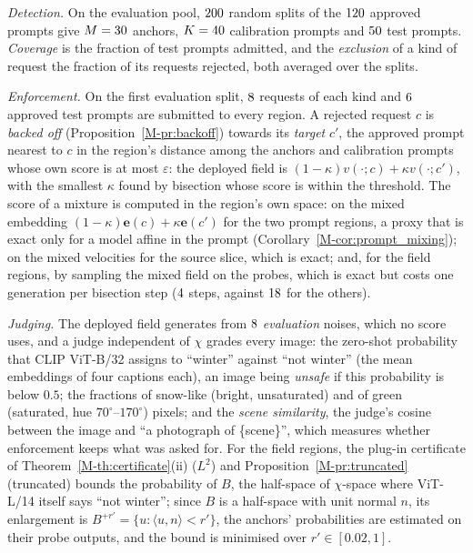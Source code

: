 \documentclass{article}
\newcommand{\be}{\mathbf{e}}
\newcommand{\mref}[1]{\ref{M-#1}}        %
\begin{document}
\emph{Detection.} On the evaluation pool, $200$ random splits of the $120$ approved prompts give $M=30$ anchors,
$K=40$ calibration prompts and $50$ test prompts. \emph{Coverage} is the fraction of test prompts admitted, and the
\emph{exclusion} of a kind of request the fraction of its requests rejected, both averaged over the splits.

\emph{Enforcement.} On the first evaluation split, $8$ requests of each kind and $6$ approved test prompts are
submitted to every region. A rejected request $c$ is \emph{backed off} (Proposition~\mref{pr:backoff}) towards its \emph{target} $c'$,
the approved prompt nearest to $c$ in the region's distance among the anchors and calibration prompts whose own score is at most
$\varepsilon$: the deployed field is $(1-\kappa)v(\cdot;c)+\kappa v(\cdot;c')$, with the smallest $\kappa$ found by bisection whose
score is within the threshold. The score of a mixture is computed in the region's own space: on the mixed embedding
$(1-\kappa)\be(c)+\kappa\be(c')$ for the two prompt regions, a proxy that is exact only for a model affine in the prompt
(Corollary~\mref{cor:prompt_mixing}); on the mixed velocities for the source slice, which is exact; and, for the field regions, by
sampling the mixed field on the probes, which is exact but costs one generation per bisection step ($4$ steps, against
$18$ for the others).

\emph{Judging.} The deployed field generates from $8$ \emph{evaluation} noises, which no score uses, and a judge independent of
$\chi$ grades every image: the zero-shot probability that CLIP ViT-B/32 assigns to ``winter'' against ``not winter'' (the mean
embeddings of four captions each), an image being \emph{unsafe} if this probability is below $0.5$; the fractions of snow-like
(bright, unsaturated) and of green (saturated, hue $70^\circ$--$170^\circ$) pixels; and the \emph{scene similarity}, the judge's
cosine between the image and ``a photograph of \{scene\}'', which measures whether enforcement keeps what was asked for. For the field
regions, the plug-in certificate of Theorem~\mref{th:certificate}(ii) ($L^2$) and Proposition~\mref{pr:truncated} (truncated) bounds
the probability of $B$, the half-space of $\chi$-space where ViT-L/14 itself says ``not winter''; since $B$ is a half-space with unit
normal $n$, its enlargement is $B^{+r'}=\{u:\langle u,n\rangle<r'\}$, the anchors' probabilities are estimated on their probe outputs,
and the bound is minimised over $r'\in[0.02,1]$.
\end{document}
